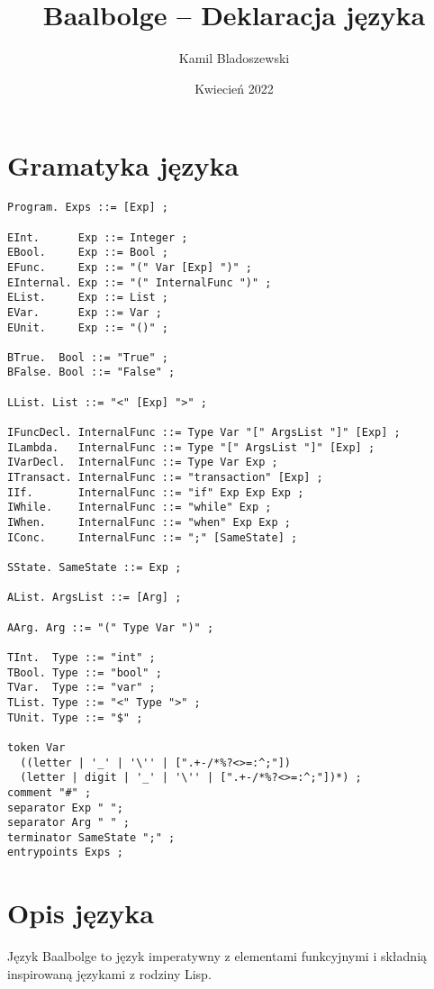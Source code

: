 \documentclass{article}
\title{Baalbolge -- Deklaracja języka}
\author{Kamil Bladoszewski}
\date{Kwiecień 2022}
\begin{document}
\maketitle

\tableofcontents

\pagebreak

\section{Gramatyka języka}

\begin{lstlisting}
Program. Exps ::= [Exp] ;

EInt.      Exp ::= Integer ;
EBool.     Exp ::= Bool ;
EFunc.     Exp ::= "(" Var [Exp] ")" ;
EInternal. Exp ::= "(" InternalFunc ")" ;
EList.     Exp ::= List ;
EVar.      Exp ::= Var ;
EUnit.     Exp ::= "()" ;

BTrue.  Bool ::= "True" ;
BFalse. Bool ::= "False" ;

LList. List ::= "<" [Exp] ">" ;

IFuncDecl. InternalFunc ::= Type Var "[" ArgsList "]" [Exp] ;
ILambda.   InternalFunc ::= Type "[" ArgsList "]" [Exp] ;
IVarDecl.  InternalFunc ::= Type Var Exp ;
ITransact. InternalFunc ::= "transaction" [Exp] ;
IIf.       InternalFunc ::= "if" Exp Exp Exp ;
IWhile.    InternalFunc ::= "while" Exp ;
IWhen.     InternalFunc ::= "when" Exp Exp ;
IConc.     InternalFunc ::= ";" [SameState] ;

SState. SameState ::= Exp ;

AList. ArgsList ::= [Arg] ;

AArg. Arg ::= "(" Type Var ")" ;

TInt.  Type ::= "int" ;
TBool. Type ::= "bool" ;
TVar.  Type ::= "var" ;
TList. Type ::= "<" Type ">" ;
TUnit. Type ::= "$" ;

token Var
  ((letter | '_' | '\'' | [".+-/*%?<>=:^;"])
  (letter | digit | '_' | '\'' | [".+-/*%?<>=:^;"])*) ;
comment "#" ;
separator Exp " ";
separator Arg " " ;
terminator SameState ";" ;
entrypoints Exps ;

\end{lstlisting}

\pagebreak

\section{Opis języka}

Język Baalbolge to język imperatywny z elementami funkcyjnymi i składnią inspirowaną językami z rodziny Lisp.
\end{document}
